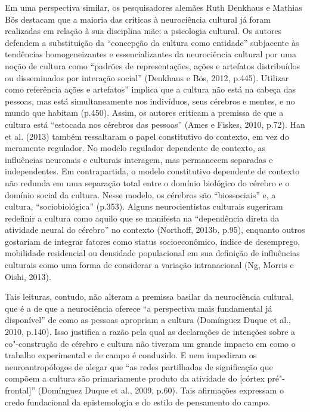 Em uma perspectiva similar, os pesquisadores alemães Ruth Denkhaus e
Mathias Bös destacam que a maioria das críticas à neurociência cultural
já foram realizadas em relação à sua disciplina mãe: a psicologia
cultural. Os autores defendem a substituição da ``concepção da cultura
como entidade'' subjacente às tendências homogeneizantes e
essencializantes da neurociência cultural por uma noção de cultura como
``padrões de representações, ações e artefatos distribuídos ou
disseminados por interação social'' (Denkhaus e Bös, 2012, p.445).
Utilizar como referência ações e artefatos'' implica que a cultura não
está na cabeça das pessoas, mas está simultaneamente nos indivíduos,
seus cérebros e mentes, e no mundo que habitam (p.450). Assim, os
autores criticam a premissa de que a cultura está ``estocada nos
cérebros das pessoas'' (Ames e Fiskes, 2010, p.72). Han et al. (2013)
também ressaltaram o papel constitutivo do contexto, em vez do meramente
regulador. No modelo regulador dependente de contexto, as influências
neuronais e culturais interagem, mas permanecem separadas e
independentes. Em contrapartida, o modelo constitutivo dependente de
contexto não redunda em uma separação total entre o domínio biológico do
cérebro e o domínio social da cultura. Nesse modelo, os cérebros são
``biossociais'' e, a cultura, ``sociobiológica'' (p.353). Alguns
neurocientistas culturais sugeriram redefinir a cultura como aquilo que
se manifesta na ``dependência direta da atividade neural do cérebro'' no
contexto (Northoff, 2013b, p.95), enquanto outros gostariam de integrar
fatores como status socioeconômico, índice de desemprego, mobilidade
residencial ou densidade populacional em sua definição de influências
culturais como uma forma de considerar a variação intranacional (Ng,
Morris e Oishi, 2013).

Tais leituras, contudo, não alteram a premissa basilar da neurociência
cultural, que é a de que a neurociência oferece ``a perspectiva mais
fundamental já disponível'' de como as pessoas apropriam a cultura
(Domínguez Duque et al., 2010, p.140). Isso justifica a razão pela qual
as declarações de intenções sobre a co"-construção de cérebro e cultura
não tiveram um grande impacto em como o trabalho experimental e de campo
é conduzido. E nem impediram os neuroantropólogos de alegar que ``as
redes partilhadas de significação que compõem a cultura são
primariamente produto da atividade do  {[}córtex pré"-frontal{]}''
(Domínguez Duque et al., 2009, p.60). Tais afirmações expressam o credo
fundacional da epistemologia e do estilo de pensamento do campo.

